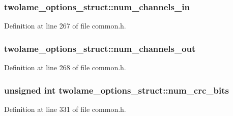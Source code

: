 \subsubsection[{\texorpdfstring{num\+\_\+channels\+\_\+in}{num_channels_in}}]{ twolame\+\_\+options\+\_\+struct\+::num\+\_\+channels\+\_\+in}\hypertarget{structtwolame__options__struct_aa0fb8d44a4383631bea2b0fa37f01eff}{}\label{structtwolame__options__struct_aa0fb8d44a4383631bea2b0fa37f01eff}


Definition at line 267 of file common.\+h.

\subsubsection[{\texorpdfstring{num\+\_\+channels\+\_\+out}{num_channels_out}}]{ twolame\+\_\+options\+\_\+struct\+::num\+\_\+channels\+\_\+out}\hypertarget{structtwolame__options__struct_a5388d86ab861953b968b2ec81bda950f}{}\label{structtwolame__options__struct_a5388d86ab861953b968b2ec81bda950f}


Definition at line 268 of file common.\+h.

\subsubsection[{\texorpdfstring{num\+\_\+crc\+\_\+bits}{num_crc_bits}}]{\setlength{\rightskip}{0pt plus 5cm}unsigned {\bf int} twolame\+\_\+options\+\_\+struct\+::num\+\_\+crc\+\_\+bits}\hypertarget{structtwolame__options__struct_a6efe63477b890f1ab423e82cd6c65bf0}{}\label{structtwolame__options__struct_a6efe63477b890f1ab423e82cd6c65bf0}


Definition at line 331 of file common.\+h.

